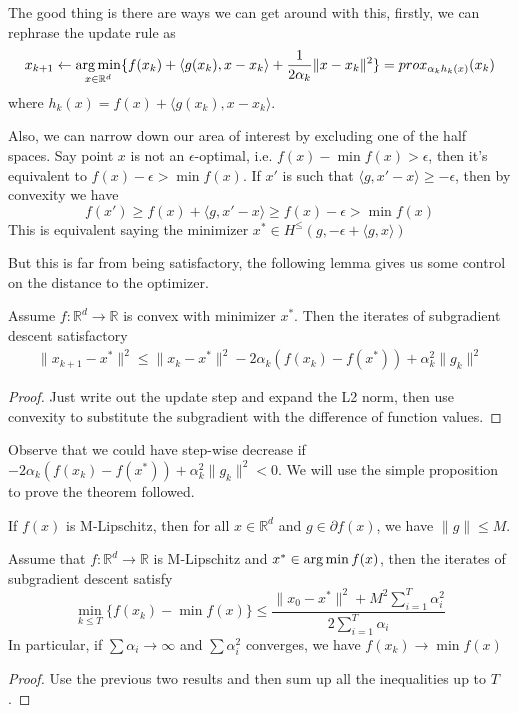 The good thing is there are ways we can get around with this, firstly, we can rephrase the update rule as 
\begin{equation*}
    x_{k+1} \leftarrow \operatorname*{arg\,min}_{x \in \mathbb{R}^d} \{ f(x_k) + \langle g(x_k), x - x_k \rangle + \frac{1}{2\alpha_k}\|x - x_k\|^2\} = prox_{\alpha_k h_k(x)}(x_k)
\end{equation*}
where $h_k(x) = f(x) + \langle g(x_k), x - x_k \rangle$. 

Also, we can narrow down our area of interest by excluding one of the half spaces. Say point $x$ is not an $\epsilon$-optimal, i.e. $f(x) - \min f(x) > \epsilon$, then it's equivalent to $f(x) - \epsilon > \min f(x)$. If $x'$ is such that $\langle g, x' - x \rangle \geq -\epsilon$, then by convexity we have
\begin{equation*}
    f(x') \geq f(x) + \langle g, x' - x \rangle \geq f(x) - \epsilon > \min f(x)
\end{equation*}
This is equivalent saying the minimizer $x^* \in H^\leq(g, -\epsilon + \langle g, x \rangle)$

But this is far from being satisfactory, the following lemma gives us some control on the distance to the optimizer.
\begin{lemma}
    Assume $f: \mathbb{R}^d \rightarrow \mathbb{R}$ is convex with minimizer $x^*$. Then the iterates of subgradient descent satisfactory
    \begin{eqnarray*}
        \| x_{k+1} - x^* \|^2 \leq \|x_k - x^*\|^2 - 2 \alpha_k (f(x_k) - f(x^*)) + \alpha_k^2\|g_k\|^2
    \end{eqnarray*}
\end{lemma}
\begin{proof}
    Just write out the update step and expand the L2 norm, then use convexity to substitute the subgradient with the difference of function values.
\end{proof}

Observe that we could have step-wise decrease if $- 2 \alpha_k (f(x_k) - f(x^*)) + \alpha_k^2\|g_k\|^2 < 0$. We will use the simple proposition to prove the theorem followed.
\begin{proposition}
    If $f(x)$ is M-Lipschitz, then for all $x \in \mathbb{R}^d$ and $g \in \partial f(x)$, we have $\|g\| \leq M$.
\end{proposition}

\begin{theorem}
    Assume that $f: \mathbb{R}^d \rightarrow \mathbb{R}$ is M-Lipschitz and $x^* \in \operatorname*{arg\,min} f(x)$, then the iterates of subgradient descent satisfy
    \begin{equation*}
        \min_{k \leq T}\{f(x_k) - \min f(x)\} \leq \frac{\|x_0 - x^*\|^2 + M^2 \sum_{i=1}^{T}\alpha_i^2}{2\sum_{i=1}^{T}\alpha_i}
    \end{equation*}
    In particular, if $\sum \alpha_i \rightarrow \infty$ and $\sum \alpha_i^2$ converges, we have $f(x_k) \rightarrow \min f(x)$
\end{theorem}
\begin{proof}
    Use the previous two results and then sum up all the inequalities up to $T$.
\end{proof}

